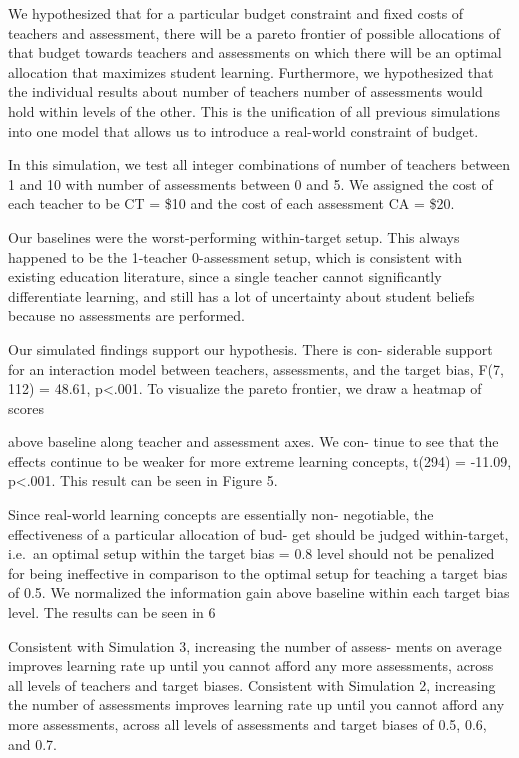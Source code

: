 \documentclass[10pt, letterpaper]{article}
\begin{document}
We hypothesized that for a particular budget constraint and fixed costs
of teachers and assessment, there will be a pareto frontier of possible
allocations of that budget towards teachers and assessments on which
there will be an optimal allocation that maximizes student learning.
Furthermore, we hypothesized that the individual results about number of
teachers number of assessments would hold within levels of the other.
This is the unification of all previous simulations into one model that
allows us to introduce a real-world constraint of budget.

In this simulation, we test all integer combinations of number of
teachers between 1 and 10 with number of assessments between 0 and 5. We
assigned the cost of each teacher to be CT = \$10 and the cost of each
assessment CA = \$20.

Our baselines were the worst-performing within-target setup. This always
happened to be the 1-teacher 0-assessment setup, which is consistent
with existing education literature, since a single teacher cannot
significantly differentiate learning, and still has a lot of uncertainty
about student beliefs because no assessments are performed.

Our simulated findings support our hypothesis. There is con- siderable
support for an interaction model between teachers, assessments, and the
target bias, F(7, 112) = 48.61, p\textless{}.001. To visualize the
pareto frontier, we draw a heatmap of scores

above baseline along teacher and assessment axes. We con- tinue to see
that the effects continue to be weaker for more extreme learning
concepts, t(294) = -11.09, p\textless{}.001. This result can be seen in
Figure 5.

Since real-world learning concepts are essentially non- negotiable, the
effectiveness of a particular allocation of bud- get should be judged
within-target, i.e.~an optimal setup within the target bias = 0.8 level
should not be penalized for being ineffective in comparison to the
optimal setup for teaching a target bias of 0.5. We normalized the
information gain above baseline within each target bias level. The
results can be seen in 6

Consistent with Simulation 3, increasing the number of assess- ments on
average improves learning rate up until you cannot afford any more
assessments, across all levels of teachers and target biases. Consistent
with Simulation 2, increasing the number of assessments improves
learning rate up until you cannot afford any more assessments, across
all levels of assessments and target biases of 0.5, 0.6, and 0.7.
\end{document}
